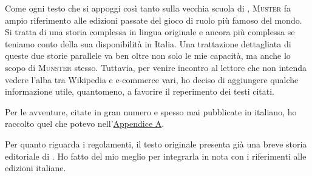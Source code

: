 Come ogni testo che si appoggi così tanto sulla vecchia scuola di \dnd{}, \textsc{Muster} fa ampio riferimento alle edizioni passate del gioco di ruolo più famoso del mondo. Si tratta di una storia complessa in lingua originale e ancora più complessa se teniamo conto della sua disponibilità in Italia. Una trattazione dettagliata di queste due storie parallele va ben oltre non solo le mie capacità, ma anche lo scopo di \textsc{Munster} stesso. Tuttavia, per venire incontro al lettore che non intenda vedere l'alba tra Wikipedia e e-commerce vari, ho deciso di aggiungere qualche informazione utile, quantomeno, a favorire il reperimento dei testi citati.

Per le avventure, citate in gran numero e spesso mai pubblicate in italiano, ho raccolto quel che potevo nell'\hyperref[appendix:ita:avventure]{Appendice A}.

Per quanto riguarda i regolamenti, il testo originale presenta già una breve storia editoriale di \dnd{}. Ho fatto del mio meglio per integrarla in nota con i riferimenti alle edizioni italiane.